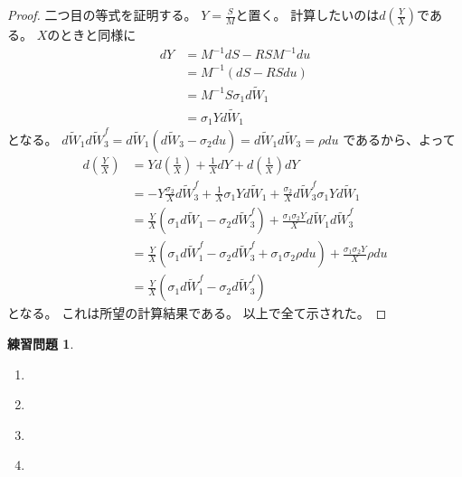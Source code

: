 \documentclass[uplatex]{jsarticle}
\theoremstyle{definition}
\newtheorem{prob}[prob]{練習問題}
\begin{document}
\begin{proof}
  二つ目の等式を証明する。
  \(Y = \frac{S}{M}\)と置く。
  計算したいのは\(d\left( \frac{Y}{X} \right)\)である。
  \(X\)のときと同様に
  \begin{align*}
    dY
    &= M^{-1}dS - RSM^{-1}du \\
    &= M^{-1}(dS - RSdu) \\
    &= M^{-1}S\sigma_1d\tilde{W}_1 \\
    &= \sigma_1Yd\tilde{W}_1
  \end{align*}
  となる。
  \(d\tilde{W}_1d\tilde{W}_3^f
  = d\tilde{W}_1(d\tilde{W}_3-\sigma_2du)
  = d\tilde{W}_1d\tilde{W}_3
  = \rho du\)
  であるから、よって
  \begin{align*}
    d\left( \frac{Y}{X} \right)
    &= Yd\left( \frac{1}{X} \right)
    + \frac{1}{X}dY + d\left( \frac{1}{X} \right)dY \\
    &= -Y\frac{\sigma_2}{X}d\tilde{W}_3^f
    + \frac{1}{X}\sigma_1Yd\tilde{W}_1
    + \frac{\sigma_2}{X}d\tilde{W}_3^f\sigma_1Yd\tilde{W}_1 \\
    &= \frac{Y}{X}\left( \sigma_1d\tilde{W}_1 - \sigma_2d\tilde{W}_3^f\right)
    + \frac{\sigma_1\sigma_2Y}{X}d\tilde{W}_1d\tilde{W}_3^f \\
    &= \frac{Y}{X}\left( \sigma_1d\tilde{W}_1^f
    - \sigma_2d\tilde{W}_3^f + \sigma_1\sigma_2\rho du \right)
    + \frac{\sigma_1\sigma_2Y}{X}\rho du \\
    &= \frac{Y}{X}\left( \sigma_1d\tilde{W}_1^f - \sigma_2d\tilde{W}_3^f \right)
  \end{align*}
  となる。
  これは所望の計算結果である。
  以上で全て示された。
\end{proof}










\begin{prob}\label{prob: 9.5}
  \begin{enumerate}
    \item \label{enumi: 9.5-1}
    \item \label{enumi: 9.5-2}
    \item \label{enumi: 9.5-3}
    \item \label{enumi: 9.5-4}
  \end{enumerate}
\end{prob}
\end{document}
